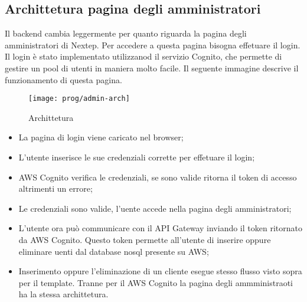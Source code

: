 \subsection{Archittetura pagina degli amministratori}
Il backend cambia leggermente per quanto riguarda la pagina degli amministratori di Nextep. Per accedere a questa pagina bisogna effetuare il login. Il login è stato implementato utilizzanod il servizio Cognito, che permette di gestire un pool di utenti in maniera molto facile. Il seguente immagine descrive il funzionamento di questa pagina. 
\begin{figure}[!h] 
	\centering 
	\texttt{[image: prog/admin-arch]} 
	\caption{Archittetura }
\end{figure} 
\begin{itemize}
	\item La pagina di login viene caricato nel browser;
	\item L'utente inserisce le sue credenziali corrette per effetuare il login;
	\item AWS Cognito verifica le credenziali, se sono valide ritorna il token di accesso altrimenti un errore;
	\item Le credenziali sono valide, l'uente accede nella pagina degli amministratori;
	\item L'utente ora può communicare con il API Gateway inviando il token ritornato da AWS Cognito. Questo token permette all'utente di inserire oppure eliminare uenti dal database nosql presente su AWS;
	\item Inserimento oppure l'eliminazione di un cliente esegue stesso flusso visto sopra per il template. Tranne per il AWS Cognito la pagina degli ammministraoti ha la stessa archittetura.
\end{itemize}
